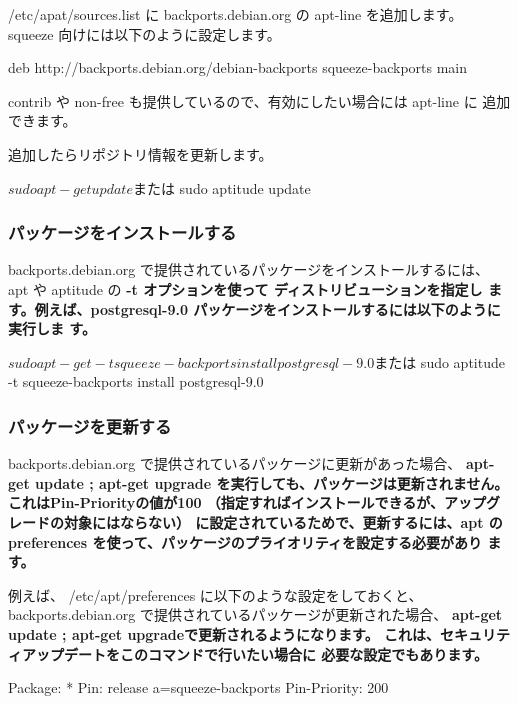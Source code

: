 \documentclass[mingoth,a4paper]{jsarticle}
\begin{document}
/etc/apat/sources.list に backports.debian.org の apt-line を追加します。
squeeze 向けには以下のように設定します。
\begin{commandline}
deb http://backports.debian.org/debian-backports squeeze-backports main
\end{commandline}

contrib や non-free も提供しているので、有効にしたい場合には apt-line に
追加できます。

追加したらリポジトリ情報を更新します。

\begin{commandline}
$ sudo apt-get update
または
$ sudo aptitude update
\end{commandline}

\subsubsection{パッケージをインストールする}

backports.debian.org で提供されているパッケージをインストールするには、
apt や aptitude の \bf{-t} オプションを使って ディストリビューションを指定し
ます。例えば、postgresql-9.0 パッケージをインストールするには以下のように実行しま
す。

\begin{commandline}
$ sudo apt-get -t squeeze-backports install postgresql-9.0
または
$ sudo aptitude -t squeeze-backports install postgresql-9.0
\end{commandline}

\subsubsection{パッケージを更新する}

backports.debian.org で提供されているパッケージに更新があった場合、
\bf{apt-get update ; apt-get upgrade}
を実行しても、パッケージは更新されません。
これはPin-Priorityの値が100
（指定すればインストールできるが、アップグレードの対象にはならない）
に設定されているためで、更新するには、apt
の preferences を使って、パッケージのプライオリティを設定する必要があり
ます。

例えば、 /etc/apt/preferences に以下のような設定をしておくと、
backports.debian.org で提供されているパッケージが更新された場合、
\bf{apt-get update ; apt-get upgrade}で更新されるようになります。
これは、セキュリティアップデートをこのコマンドで行いたい場合に
必要な設定でもあります。
\begin{commandline}
Package: *
Pin: release a=squeeze-backports
Pin-Priority: 200
\end{commandline}
\end{document}
